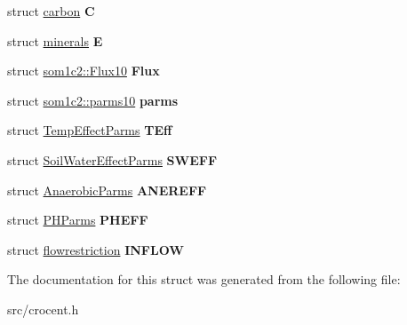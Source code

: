 \begin{DoxyCompactItemize}
\item 
\hypertarget{structsom1c2_abdfe4fa2bd42ade525892fbce391b54e}{struct \hyperlink{structcarbon}{carbon} {\bfseries C}}\label{structsom1c2_abdfe4fa2bd42ade525892fbce391b54e}

\item 
\hypertarget{structsom1c2_ace9d68ea21be77fab7cc3685d6a97af2}{struct \hyperlink{structminerals}{minerals} {\bfseries E}}\label{structsom1c2_ace9d68ea21be77fab7cc3685d6a97af2}

\item 
\hypertarget{structsom1c2_abd42e07926dc068eda52c3385a4ff0f7}{struct \hyperlink{structsom1c2_1_1_flux10}{som1c2\-::\-Flux10} {\bfseries Flux}}\label{structsom1c2_abd42e07926dc068eda52c3385a4ff0f7}

\item 
\hypertarget{structsom1c2_a6b11d4bcc7c52496fe42668572287106}{struct \hyperlink{structsom1c2_1_1parms10}{som1c2\-::parms10} {\bfseries parms}}\label{structsom1c2_a6b11d4bcc7c52496fe42668572287106}

\item 
\hypertarget{structsom1c2_a188b2cb2cc0dc4c42c0dff9517d51d67}{struct \hyperlink{struct_temp_effect_parms}{Temp\-Effect\-Parms} {\bfseries T\-Eff}}\label{structsom1c2_a188b2cb2cc0dc4c42c0dff9517d51d67}

\item 
\hypertarget{structsom1c2_a0cc6dcf757e927277031e21c4d3f63e0}{struct \hyperlink{struct_soil_water_effect_parms}{Soil\-Water\-Effect\-Parms} {\bfseries S\-W\-E\-F\-F}}\label{structsom1c2_a0cc6dcf757e927277031e21c4d3f63e0}

\item 
\hypertarget{structsom1c2_a2ba8406f821371d59d38c7a3a025fd4d}{struct \hyperlink{struct_anaerobic_parms}{Anaerobic\-Parms} {\bfseries A\-N\-E\-R\-E\-F\-F}}\label{structsom1c2_a2ba8406f821371d59d38c7a3a025fd4d}

\item 
\hypertarget{structsom1c2_a810d5e30d14447e1eaf949ef6ccb9e78}{struct \hyperlink{struct_p_h_parms}{P\-H\-Parms} {\bfseries P\-H\-E\-F\-F}}\label{structsom1c2_a810d5e30d14447e1eaf949ef6ccb9e78}

\item 
\hypertarget{structsom1c2_a749f682aa03f112826d36cc9fdb70881}{struct \hyperlink{structflowrestriction}{flowrestriction} {\bfseries I\-N\-F\-L\-O\-W}}\label{structsom1c2_a749f682aa03f112826d36cc9fdb70881}

\end{DoxyCompactItemize}


The documentation for this struct was generated from the following file\-:\begin{DoxyCompactItemize}
\item 
src/crocent.\-h\end{DoxyCompactItemize}
